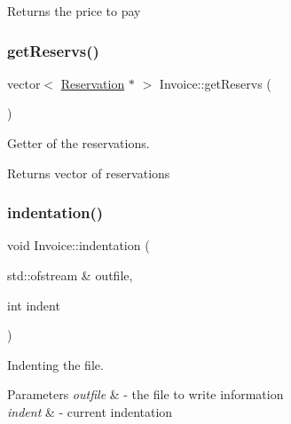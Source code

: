\begin{DoxyReturn}{Returns}
the price to pay 
\end{DoxyReturn}
\mbox{\label{class_invoice_a98ede540a39d22c91a3bc6c5b28116fd}} 
\subsubsection{\texorpdfstring{get\+Reservs()}{getReservs()}}
{\footnotesize\ttfamily vector$<$ \mbox{\hyperlink{class_reservation}{Reservation}} $\ast$ $>$ Invoice\+::get\+Reservs (\begin{DoxyParamCaption}{ }\end{DoxyParamCaption})}



Getter of the reservations. 

\begin{DoxyReturn}{Returns}
vector of reservations 
\end{DoxyReturn}
\mbox{\label{class_invoice_a08ce5090cf11e9f74820810d3796dea2}} 
\subsubsection{\texorpdfstring{indentation()}{indentation()}}
{\footnotesize\ttfamily void Invoice\+::indentation (\begin{DoxyParamCaption}\item[{std\+::ofstream \&}]{outfile,  }\item[{int}]{indent }\end{DoxyParamCaption})}



Indenting the file. 


\begin{DoxyParams}{Parameters}
{\em outfile} & -\/ the file to write information \\
\hline
{\em indent} & -\/ current indentation \\
\hline
\end{DoxyParams}
\mbox{\label{class_invoice_aae19e485510f08c56be425b4634246ed}} 

